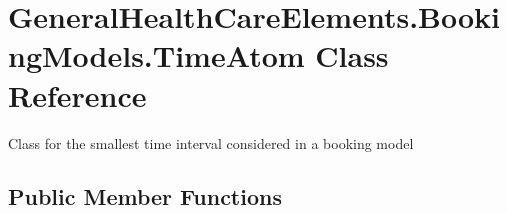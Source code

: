\hypertarget{class_general_health_care_elements_1_1_booking_models_1_1_time_atom}{}\section{General\+Health\+Care\+Elements.\+Booking\+Models.\+Time\+Atom Class Reference}
\label{class_general_health_care_elements_1_1_booking_models_1_1_time_atom}


Class for the smallest time interval considered in a booking model  


\subsection*{Public Member Functions}
